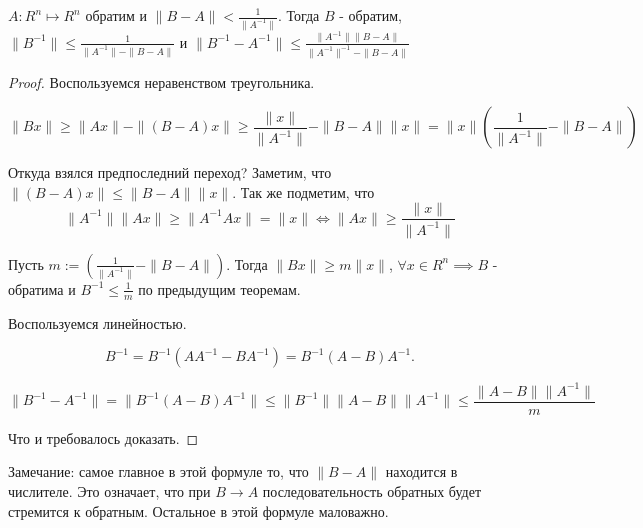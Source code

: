 \begin{theorem} \thmslashn
	
	$A: R^n \mapsto R^n$ обратим и $\|B - A\| < \frac{1}{\|A^{-1}\|}$. Тогда $B$ - обратим, $\|B^{-1}\| \le \frac{1}{\|A^{-1}\| - \|B - A\|}$ и $\|B^{-1} - A^{-1}\| \le \frac{\|A^{-1}\| \|B - A\|}{\|A^{-1}\|^{-1} - \|B - A\| }$
	\begin{proof} \thmslashn
		
		 Воспользуемся неравенством треугольника.
		
		\[
		\|Bx\|
		\ge
		\|Ax\| - \|(B - A)x\|
		\ge
		\frac{\|x\|}{\|A^{-1}\|} - \|B - A\|\|x\|
		=
		\|x\|(\frac{1}{\|A^{-1}\|} - \|B - A\|)
		\]
		
		Откуда взялся предпоследний переход? Заметим, что $\|(B - A)x\| \le \|B  - A\| \|x\|$. Так же подметим, что 
		\[
		\|A^{-1}\| \|Ax\| \ge \|A^{-1}Ax\|
		=
		\|x\| 
		\iff
		\|Ax\|
		\ge 
		\frac{\|x\|}{\|A^{-1}\|}
		\]
		
		Пусть $m:= (\frac{1}{\|A^{-1}\|} - \|B - A\|)$. Тогда $ \|Bx\| \ge m\|x\|$, $\forall x \in R^n \implies B$ - обратима и $B^{-1} \le \frac{1}{m}$ по предыдущим теоремам. 
		
		Воспользуемся линейностью.
		
		\[
		B^{-1} 
		=
		B^{-1}(AA^{-1} - BA^{-1})
		=
		B^{-1}(A - B)A^{-1}.
		\]
		
		\[
		\|B^{-1} - A^{-1}\| 
		=
		\|B^{-1}(A-B)A^{-1}\|
		\le
		\|B^{-1}\|\|A - B\|\|A^{-1}\|
		\le
		\frac{\|A - B\|\|A^{-1}\|}{m}
		\]
		
		Что и требовалось доказать.
	\end{proof}
\end{theorem}

\begin{remark} \thmslashn
	
	Замечание: самое главное в этой формуле то, что $\|B - A\|$ находится в числителе. Это означает, что при $B \to A$ последовательность обратных будет стремится к обратным. Остальное в этой формуле маловажно.
\end{remark}
